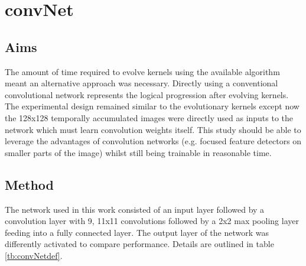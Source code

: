 \section{convNet}

\subsection{Aims}
The amount of time required to evolve kernels using the available algorithm meant an alternative approach was necessary. 
Directly using a conventional convolutional network represents the logical progression after evolving kernels. 
The experimental design remained similar to the evolutionary kernels except now the 128x128 temporally accumulated images were directly used as inputs to the network which must learn convolution weights itself. 
This study should be able to leverage the advantages of convolution networks (e.g. focused feature detectors on smaller parts of the image) whilst still being trainable in reasonable time. 


\subsection{Method}
\label{sec:convMethod}
The network used in this work consisted of an input layer followed by a convolution layer with 9, 11x11 convolutions followed by a 2x2 max pooling layer feeding into a fully connected layer. The output layer of the network was differently activated to compare performance. Details are outlined in table \ref{tb:convNetdef}.

